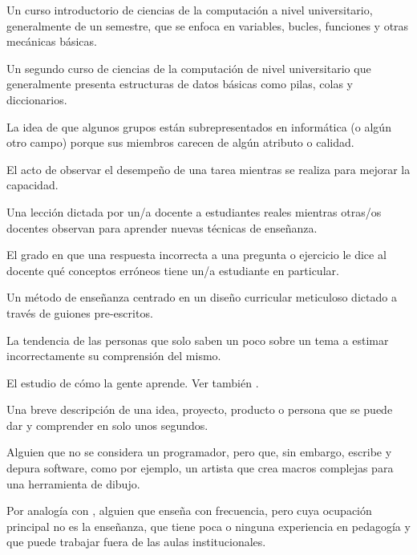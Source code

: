 \begin{description}
 Un curso introductorio de ciencias de la computación a nivel universitario, 
generalmente de un semestre, que se enfoca en variables, bucles, funciones y otras mecánicas básicas.

 Un segundo curso de ciencias de la computación de nivel universitario 
que generalmente presenta estructuras de datos básicas como pilas, colas y diccionarios.

 La idea de que algunos grupos 
están subrepresentados en informática (o algún otro campo) porque sus miembros 
carecen de algún atributo o calidad.

 El acto de observar el desempeño 
de una tarea mientras se realiza para mejorar la capacidad.

 Una lección dictada por un/a docente a estudiantes reales 
mientras otras/os docentes observan para aprender nuevas técnicas de enseñanza.

 El grado en que una respuesta incorrecta 
a una pregunta o ejercicio le dice al docente qué conceptos erróneos tiene un/a estudiante en particular.

 Un método de enseñanza centrado 
en un diseño curricular meticuloso dictado a través de guiones pre-escritos.

 La tendencia de las personas que solo saben 
un poco sobre un tema a estimar incorrectamente su comprensión del mismo.

 El estudio de cómo
la gente aprende. Ver también .


 Una breve descripción de una idea, 
proyecto, producto o persona que se puede dar y comprender en solo unos segundos.

 Alguien que no se considera 
un programador, pero que, sin embargo, escribe y depura software, como por ejemplo, un artista que 
crea macros complejas para una herramienta de dibujo.

 Por analogía con
,
alguien que enseña con frecuencia, pero cuya ocupación principal no es la enseñanza, 
que tiene poca o ninguna experiencia en pedagogía y que puede trabajar fuera de las aulas institucionales.


\end{description}
